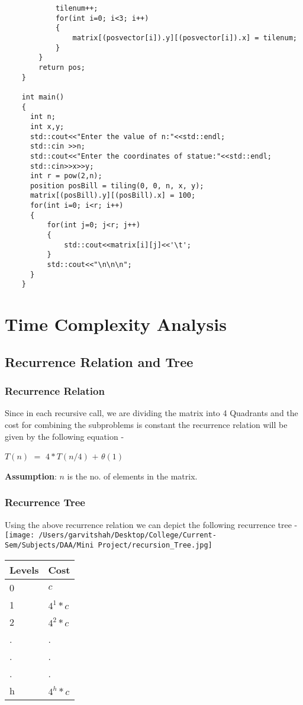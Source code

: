 \documentclass{article}
\begin{document}
\begin{lstlisting}
            tilenum++;
            for(int i=0; i<3; i++)
            {
                matrix[(posvector[i]).y][(posvector[i]).x] = tilenum;
            }
        }
        return pos;
    }

    int main()
    {
      int n;
      int x,y;
      std::cout<<"Enter the value of n:"<<std::endl;
      std::cin >>n;
      std::cout<<"Enter the coordinates of statue:"<<std::endl;
      std::cin>>x>>y;
      int r = pow(2,n);
      position posBill = tiling(0, 0, n, x, y);
      matrix[(posBill).y][(posBill).x] = 100;
      for(int i=0; i<r; i++)
      {
          for(int j=0; j<r; j++)
          {
              std::cout<<matrix[i][j]<<'\t';
          }
          std::cout<<"\n\n\n";
      }
    }
    \end{lstlisting}
    
    \newpage   
    \section{Time Complexity Analysis} 
    \subsection{Recurrence Relation and Tree}
    \subsubsection{Recurrence Relation}
    Since in each recursive call, we are dividing the matrix into 4 Quadrants and the cost for combining the subproblems is constant
    the recurrence relation will be given by the following equation - 
    \\
    \begin{center}
    $T(n)$ $=$ $4*T(n/4)$ $+$ $\theta(1)$
    \end{center}

    \textbf{Assumption}: $n$ is the no. of elements in the matrix. 
    
    \subsubsection{Recurrence Tree}
    Using the above recurrence relation we can depict the following recurrence tree -
    \\
    \texttt{[image: /Users/garvitshah/Desktop/College/Current-Sem/Subjects/DAA/Mini Project/recursion\_Tree.jpg]}
    \begin{table}[h!] 
      \centering     
      \begin{tabular}{ | p{3cm} | p{3cm} | }  
        \hline
       Levels & Cost\\
       \hline
       0 & $c$\\
       1 & $4^{1}*c$\\
       2 & $4^2*c$\\
       . & .\\
       . & . \\
       . & . \\
       h & $4^h*c$\\
       \hline
      \end{tabular}
   \end{table}
  
\end{document}
